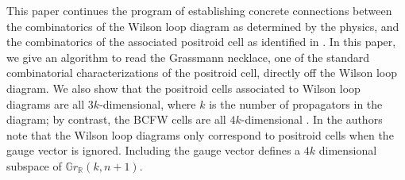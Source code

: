 \documentclass[11pt]{article}
\newcommand{\hlfix}[2]{\texthl{#1}\todo{#2}}
\newcommand{\sanote}{\todo[color=violet!30]}
\newcommand{\R}{\mathbb{R}}
\theoremstyle{remark}
\theoremstyle{definition}
\begin{document}

This paper continues the program of establishing concrete connections between the combinatorics of the Wilson loop diagram as determined by the physics, and the combinatorics of the associated positroid cell as identified in \cite{wilsonloop}. In this paper, we give an algorithm to read the Grassmann necklace, one of the standard combinatorial characterizations of the positroid cell, directly off the Wilson loop diagram. We also show that the positroid cells associated to Wilson loop diagrams are all $3k$-dimensional, where $k$ is the number of propagators in the diagram; by contrast, the BCFW cells are all $4k$-dimensional \cite{Arkani-Hamed:2013jha}. In \cite{non-orientable} the authors note that the Wilson loop diagrams only correspond to positroid cells when the gauge vector is ignored. Including the gauge vector defines a $4k$ dimensional subspace of $\mathbb{G}r_\R(k,n+1)$.
\end{document}
